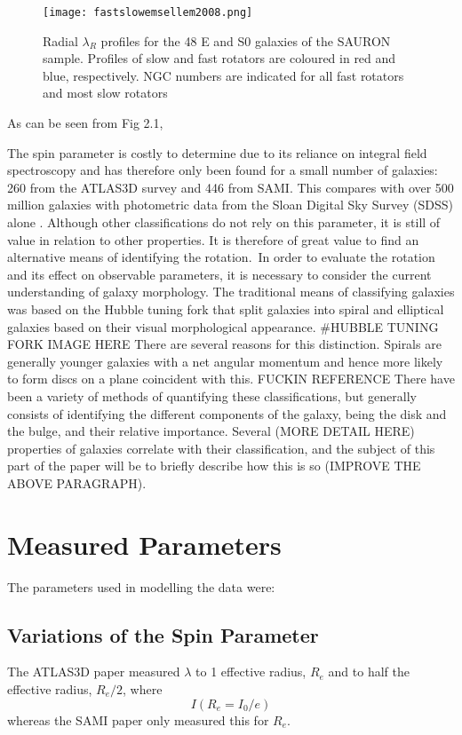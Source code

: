 \begin{figure}[h]
	\caption{Radial $\lambda_{R}$ profiles for the 48 E and S0 galaxies of the SAURON
	sample. Profiles of slow and fast rotators are coloured in red and blue, respectively.
	NGC numbers are indicated for all fast rotators and most slow
	rotators \cite[p.6]{Emsellem2011}}
	\centering
	\texttt{[image: fastslowemsellem2008.png]}
\end{figure}

As can be seen from Fig 2.1, 

The spin parameter is costly to determine due to its reliance on integral field spectroscopy and has therefore only been found for a small number of galaxies: 260 from the ATLAS3D survey and 446 from SAMI. This compares with over 500 million galaxies with photometric data from the Sloan Digital Sky Survey (SDSS) alone \cite{SDSS}. Although other classifications do not rely on this parameter, it is still of value in relation to other properties. It is therefore of great value to find an alternative means of identifying the rotation.\
In order to evaluate the rotation and its effect on observable parameters, it is necessary to consider the current understanding of galaxy morphology. The traditional means of classifying galaxies was based on the Hubble tuning fork that split galaxies into spiral and elliptical galaxies based on their visual morphological appearance.
#HUBBLE TUNING FORK IMAGE HERE
There are several reasons for this distinction. Spirals are generally younger galaxies with a net angular momentum and hence more likely to form discs on a plane coincident with this. FUCKIN REFERENCE
There have been a variety of methods of quantifying these classifications, but generally consists of identifying the different components of the galaxy, being the disk and the bulge, and their relative importance.  Several (MORE DETAIL HERE) properties of galaxies correlate with their classification, and the subject of this part of the paper will be to briefly describe how this is so (IMPROVE THE ABOVE PARAGRAPH).
\section{Measured Parameters}
The parameters used in modelling the data were:
\subsection{Variations of the Spin Parameter}
The ATLAS3D paper measured $\lambda$ to 1 effective radius, $R_{e}$ and to half the effective radius, $R_{e}/2$, where 
\begin{equation}
I(R_{e}=I_{0}/e)
\end{equation}
whereas the SAMI paper only measured this for $R_{e}$\cite[p.~3]{Cortese2016}. 
